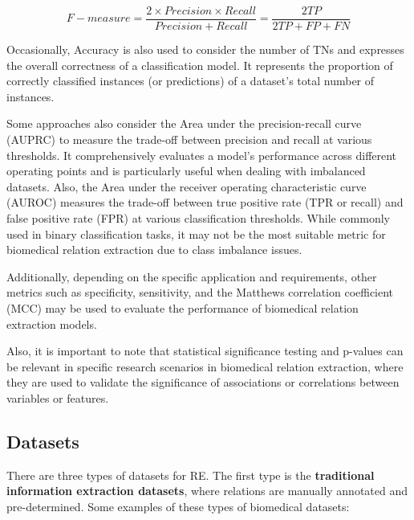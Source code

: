 \begin{equation}
F-measure = \frac{2\times Precision\times Recall}{Precision + Recall} = \frac{2 TP}{2 TP + FP + FN}
\label{equation:evaluation}
\end{equation} 

Occasionally, Accuracy is also used to consider the number of TNs and expresses the overall correctness of a classification model. It represents the proportion of correctly classified instances (or predictions) of a dataset's total number of instances.

Some approaches also consider the Area under the precision-recall curve (AUPRC) to measure the trade-off between precision and recall at various thresholds. It comprehensively evaluates a model's performance across different operating points and is particularly useful when dealing with imbalanced datasets. Also, the Area under the receiver operating characteristic curve (AUROC) measures the trade-off between true positive rate (TPR or recall) and false positive rate (FPR) at various classification thresholds. While commonly used in binary classification tasks, it may not be the most suitable metric for biomedical relation extraction due to class imbalance issues.

Additionally, depending on the specific application and requirements, other metrics such as specificity, sensitivity, and the Matthews correlation coefficient (MCC) may be used to evaluate the performance of biomedical relation extraction models. 

Also, it is important to note that statistical significance testing and p-values can be relevant in specific research scenarios in biomedical relation extraction, where they are used to validate the significance of associations or correlations between variables or features. 

\subsection{Datasets}

There are three types of datasets for RE. The first type is the \textbf{traditional information extraction datasets}, where relations are manually annotated and pre-determined. Some examples of these types of biomedical datasets:

